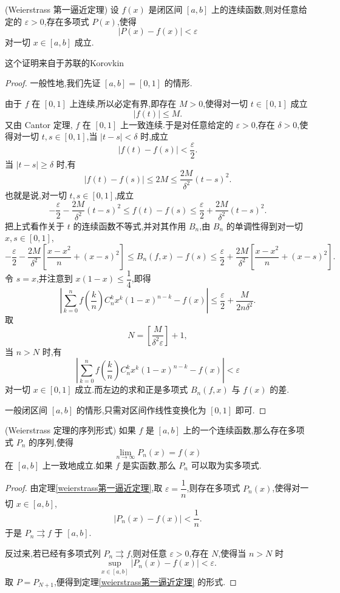 \begin{theorem}(Weierstrass 第一逼近定理)\label{weierstrass第一逼近定理}
	设 $f(x)$ 是闭区间 $[a,b]$ 上的连续函数,则对任意给定的 $\varepsilon>0$,存在多项式 $P(x)$,使得
	\[
	|P(x)-f(x)|<\varepsilon
	\]
	对一切 $x\in[a,b]$ 成立.
\end{theorem}
这个证明来自于苏联的Korovkin
\begin{proof}
	一般性地,我们先证 $[a,b]=[0,1]$ 的情形.
	
	由于 $f$ 在 $[0,1]$ 上连续,所以必定有界,即存在 $M>0$,使得对一切 $t\in[0,1]$ 成立
	\[
	|f(t)|\leqslant M.
	\]
	又由 Cantor 定理, $f$ 在 $[0,1]$ 上一致连续.于是对任意给定的 $\varepsilon>0$,存在 $\delta>0$,使得对一切 $t,s\in[0,1]$,当 $|t-s|<\delta$ 时,成立
	\[
	|f(t)-f(s)|<\frac{\varepsilon}{2}.
	\]
	当 $|t-s|\geqslant\delta$ 时,有
	\[
	|f(t)-f(s)|\leqslant 2M\leqslant\frac{2M}{\delta^2}(t-s)^2.
	\]
	也就是说,对一切 $t,s\in[0,1]$,成立
	\[
	-\frac{\varepsilon}{2}-\frac{2M}{\delta^2}(t-s)^2
	\leqslant f(t)-f(s)\leqslant
	\frac{\varepsilon}{2}+\frac{2M}{\delta^2}(t-s)^2.
	\]
	把上式看作关于 $t$ 的连续函数不等式,并对其作用 $B_n$,由 $B_n$ 的单调性得到对一切 $x,s\in[0,1]$,
	\[
	-\frac{\varepsilon}{2}-\frac{2M}{\delta^2}\left[\frac{x-x^2}{n}+(x-s)^2\right]
	\leqslant B_n(f,x)-f(s)
	\leqslant
	\frac{\varepsilon}{2}+\frac{2M}{\delta^2}\left[\frac{x-x^2}{n}+(x-s)^2\right].
	\]
	令 $s=x$,并注意到 $x(1-x)\leqslant\dfrac14$,即得
	\[
	\left|\sum_{k=0}^{n} f\left(\frac{k}{n}\right)C_n^k x^k(1-x)^{n-k}-f(x)\right|
	\leqslant \frac{\varepsilon}{2}+\frac{M}{2n\delta^2}.
	\]
	取
	\[
	N=\left[\frac{M}{\delta^2\varepsilon}\right]+1,
	\]
	当 $n>N$ 时,有
	\[
	\left|\sum_{k=0}^{n} f\left(\frac{k}{n}\right)C_n^k x^k(1-x)^{n-k}-f(x)\right|<\varepsilon
	\]
	对一切 $x\in[0,1]$ 成立.而左边的求和正是多项式 $B_n(f,x)$ 与 $f(x)$ 的差.
	
	一般闭区间 $[a,b]$ 的情形,只需对区间作线性变换化为 $[0,1]$ 即可.
\end{proof}

\begin{proposition}(Weierstrass 定理的序列形式)\label{weierstrass序列形式}
	如果 $f$ 是 $[a,b]$ 上的一个连续函数,那么存在多项式 $P_n$ 的序列,使得
	\[
	\lim_{n\to\infty}P_n(x)=f(x)
	\]
	在 $[a,b]$ 上一致地成立.如果 $f$ 是实函数,那么 $P_n$ 可以取为实多项式.
\end{proposition}

\begin{proof}
	由定理\ref{weierstrass第一逼近定理},取 $\varepsilon=\dfrac1n$,则存在多项式 $P_n(x)$,使得对一切 $x\in[a,b]$,
	\[
	|P_n(x)-f(x)|<\frac1n.
	\]
	于是 $P_n\rightrightarrows f$ 于 $[a,b]$.
	
	反过来,若已经有多项式列 $P_n\rightrightarrows f$,则对任意 $\varepsilon>0$,存在 $N$,使得当 $n>N$ 时
	\[
	\sup_{x\in[a,b]}|P_n(x)-f(x)|<\varepsilon.
	\]
	取 $P=P_{N+1}$,便得到定理\ref{weierstrass第一逼近定理} 的形式.
\end{proof}

